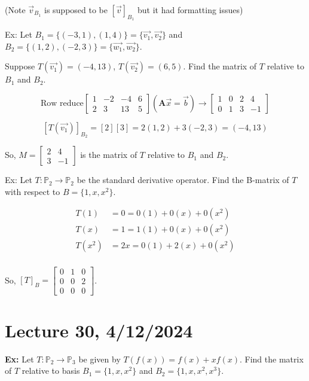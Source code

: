 \documentclass{article}
\begin{document}
(Note $\vec{v}_{B_1}$ is supposed to be $[\vec{v}]_{B_1}$ but it had formatting issues)

\medskip

Ex: Let \( B_1 = \{(-3, 1), (1,4)\} = \{\vec{v_1}, \vec{v_2}\} \) and \( B_2 = \{(1,2), (-2,3)\} = \{\vec{w_1}, \vec{w_2}\} \).

Suppose \( T(\vec{v_1}) = (-4, 13) \), \( T(\vec{v_2}) = (6, 5) \). Find the matrix of \( T \) relative to \( B_1 \) and \( B_2 \).

\[
\text{Row reduce} \begin{bmatrix} 1 & -2 & -4 & 6 \\ 2 & 3 & 13 & 5 \end{bmatrix} (\mathbf{A}\vec{x} = \vec{b}) \rightarrow \begin{bmatrix} 1 & 0 & 2 & 4 \\ 0 & 1 & 3 & -1 \end{bmatrix}
\]

\[ [T(\vec{v_1})]_{B_2} = [2][3] = 2(1,2)+3(-2,3) = (-4, 13) \]

So, \( M = \begin{bmatrix} 2 & 4 \\ 3 & -1 \end{bmatrix} \) is the matrix of \( T \) relative to \( B_1 \) and \( B_2 \).

Ex: Let \( T : \mathbb{P}_2 \rightarrow \mathbb{P}_2 \) be the standard derivative operator. Find the B-matrix of \( T \) with respect to \( B = \{1, x, x^2\} \).


\begin{align*}
T(1) &= 0 = 0(1) + 0(x) + 0(x^2) \\
T(x) &= 1 = 1(1) + 0(x) + 0(x^2) \\
T(x^2) &= 2x = 0(1) + 2(x) + 0(x^2) \\
\end{align*}


So, \( [T]_B = \begin{bmatrix} 0 & 1 & 0 \\ 0 & 0 & 2 \\ 0 & 0 & 0 \end{bmatrix} \).


\section{Lecture 30, 4/12/2024}

\textbf{Ex:} Let $T : \mathbb{P}_2 \rightarrow \mathbb{P}_3$ be given by $T(f(x)) = f(x) + xf(x)$. Find the matrix of $T$ relative to basis $B_1 = \{1, x, x^2\}$ and $B_2 = \{1, x, x^2, x^3\}$.
\end{document}
